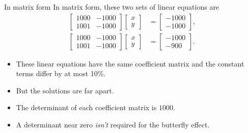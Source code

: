\documentclass[usenames,dvipsnames,fleqn]{beamer}
\theoremstyle{definition}
\begin{document}
\begin{frame}{In matrix form}
In matrix form, these two sets of linear equations are
\begin{align*}
 \begin{bmatrix} 1000& -1000 \\ 1001 & -1000 \end{bmatrix} \begin{bmatrix} x \\ y \end{bmatrix} &= 
     \begin{bmatrix} -1000 \\ -1000 \end{bmatrix}, \\
 \begin{bmatrix} 1000 & -1000 \\ 1001 & -1000 \end{bmatrix} \begin{bmatrix} x \\ y \end{bmatrix} &= 
     \begin{bmatrix} -1000 \\ -900 \end{bmatrix}.   
\end{align*}

\begin{itemize}

\item These linear equations have the same coefficient matrix and the constant terms differ by at most 10\%.

\item But the solutions are far apart. 

\item The determinant of each coefficient matrix is \(1000\).

\item A  determinant near zero \emph{isn't} required for the butterfly effect.



\end{itemize}
\end{frame}
\end{document}
